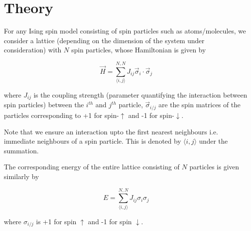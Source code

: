 \section{Theory}
\label{sec:theory} 

For any Ising spin model consisting of spin particles such as atoms/molecules, we consider a lattice (depending on the dimension of the system under consideration) with \( N \) spin particles, whose Hamiltonian is given by

\begin{equation}
    \vec{H} = \sum_{\langle i, j \rangle}^{N, N} J_{ij} \vec{\sigma}_i \cdot \vec{\sigma}_j
\end{equation}

where \( J_{ij} \) is the coupling strength (parameter quantifying the interaction between spin particles) between the \( i^{th} \) and \( j^{th} \) particle, \( \vec{\sigma}_{i/j} \) are the spin matrices of the particles corresponding to +1 for spin-\( \uparrow \) and -1 for spin-\( \downarrow \).

Note that we ensure an interaction upto the first nearest neighbours i.e. immediate neighbours of a spin particle.
This is denoted by \( \langle i, j \rangle \) under the summation. 

The corresponding energy of the entire lattice consisting of \( N \) particles is given similarly by

\begin{equation}
    E = \sum_{\langle i, j \rangle}^{N, N} J_{ij} \sigma_i  \sigma_j
\end{equation}

where \( \sigma_{i/j} \) is +1 for spin \( \uparrow \) and -1 for spin \( \downarrow \).
